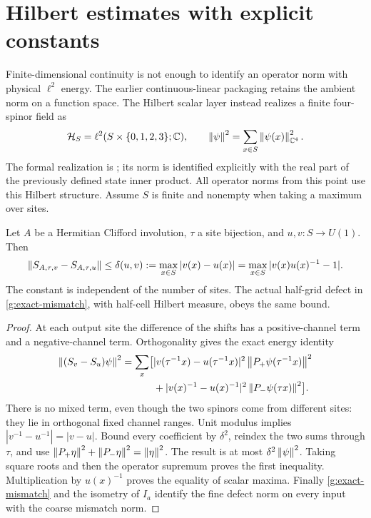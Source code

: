 \section{Hilbert estimates with explicit constants}
\label{g:hilbert-estimates}
Finite-dimensional continuity is not enough to identify an operator norm with physical $\ell^2$ energy. The earlier continuous-linear packaging retains the ambient norm on a function space. The Hilbert scalar layer instead realizes a finite four-spinor field as
\[
 \mathcal H_S=\ell^2(S\times\{0,1,2,3\};\mathbb C),\qquad
 \left\lVert\psi\right\rVert^2=\sum_{x\in S}\left\lVert\psi(x)\right\rVert_{\mathbb C^4}^2.
\]
The formal realization is ; its norm is identified explicitly with the real part of the previously defined state inner product. All operator norms from this point use this Hilbert structure. Assume $S$ is finite and nonempty when taking a maximum over sites.

\begin{theorem}
Let $A$ be a Hermitian Clifford involution, $\tau$ a site bijection, and $u,v:S\to U(1)$. Then
\begin{equation}
 \left\lVert S_{A,\tau,v}-S_{A,\tau,u}\right\rVert
 \leq\delta(u,v):=\max_{x\in S}|v(x)-u(x)|
 =\max_{x\in S}|v(x)u(x)^{-1}-1|.
 \label{g:constant-one}
\end{equation}
The constant is independent of the number of sites. The actual half-grid defect in \eqref{g:exact-mismatch}, with half-cell Hilbert measure, obeys the same bound.
\end{theorem}
\begin{proof}
At each output site the difference of the shifts has a positive-channel term and a negative-channel term. Orthogonality gives the exact energy identity
\begin{align*}
 \left\lVert(S_v-S_u)\psi\right\rVert^2
 =\sum_x\bigl[&|v(\tau^{-1}x)-u(\tau^{-1}x)|^2
                   \left\lVert P_+\psi(\tau^{-1}x)\right\rVert^2\\
 &+|v(x)^{-1}-u(x)^{-1}|^2
                   \left\lVert P_-\psi(\tau x)\right\rVert^2\bigr].
\end{align*}
There is no mixed term, even though the two spinors come from different sites: they lie in orthogonal fixed channel ranges. Unit modulus implies $|v^{-1}-u^{-1}|=|v-u|$. Bound every coefficient by $\delta^2$, reindex the two sums through $\tau$, and use $\left\lVert P_+\eta\right\rVert^2+\left\lVert P_-\eta\right\rVert^2=\left\lVert\eta\right\rVert^2$. The result is at most $\delta^2\left\lVert\psi\right\rVert^2$. Taking square roots and then the operator supremum proves the first inequality. Multiplication by $u(x)^{-1}$ proves the equality of scalar maxima. Finally \eqref{g:exact-mismatch} and the isometry of $I_a$ identify the fine defect norm on every input with the coarse mismatch norm.
\end{proof}

